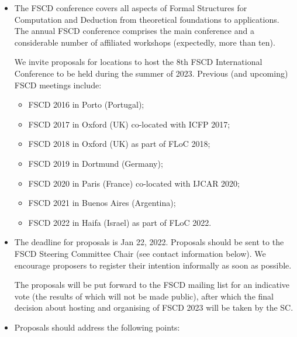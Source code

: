 \documentclass[prodmode,acmtecs]{acmsmall} %
\begin{document}
\begin{itemize}\item   The FSCD conference covers all aspects of Formal Structures for Computation and Deduction from theoretical foundations to applications. The annual FSCD conference comprises the main conference and a considerable number of affiliated workshops (expectedly, more than ten). 
 
  We invite proposals for locations to host the 8th FSCD International Conference to be held during the summer of 2023. Previous (and upcoming) FSCD meetings include: 
 
\begin{itemize}\item  FSCD 2016 in Porto (Portugal);
\item  FSCD 2017 in Oxford (UK) co-located with ICFP 2017;
\item  FSCD 2018 in Oxford (UK) as part of FLoC 2018;
\item  FSCD 2019 in Dortmund (Germany);
\item  FSCD 2020 in Paris (France) co-located with IJCAR 2020;
\item  FSCD 2021 in Buenos Aires (Argentina);
\item  FSCD 2022 in Haifa (Israel) as part of FLoC 2022.
\end{itemize} 
\item  The deadline for proposals is  Jan 22, 2022. Proposals should be sent to the FSCD Steering Committee Chair (see contact information below). We encourage proposers to register their intention informally as soon as possible. 
 
  The proposals will be put forward to the FSCD mailing list for an indicative vote (the results of which will not be made public), after which the final decision about hosting and organising of FSCD 2023 will be taken by the SC. 
 
\item  Proposals should address the following points: 
 

\end{itemize}
\end{document}
